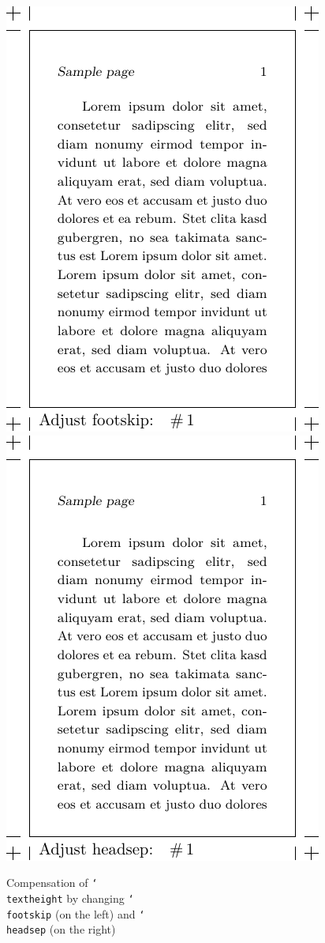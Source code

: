 \documentclass[11pt]{article}
\DeclareRobustCommand\cmd[1]{\texttt{\char`\\#1}}
\begin{document}
\begin{figure}[bt]
\noindent
\includegraphics{adjustfoot}\hfill
\includegraphics{adjusthead}

\vb
\caption{Compensation of \cmd{textheight} by changing \cmd{footskip} (on the left) and
\cmd{headsep} (on the right)}\label{adj}
\end{figure}
\end{document}
